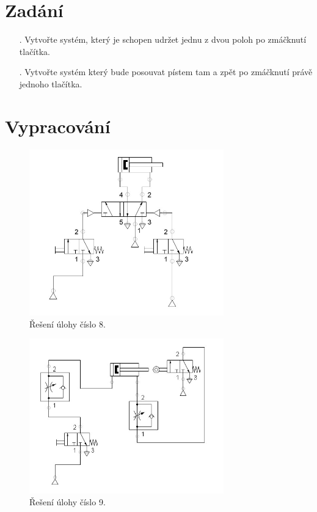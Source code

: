 \documentclass[a4paper]{article}
\begin{document}



\section*{Zadání}
\setcounter{foo}{8}
 

\begin{itemize}
	\item [\arabic{foo}.] Vytvořte systém, který je schopen udržet jednu z dvou poloh po zmáčknutí tlačítka.
	\setcounter{foo}{9}
	\item [\arabic{foo}.] Vytvořte systém který bude posouvat pístem tam a zpět po zmáčknutí právě jednoho tlačítka.
\end{itemize}

\section*{Vypracování}



\begin{figure}[H]
	\centering
	\includegraphics[width=0.75\textwidth]{lul.jpg}
	\caption{Řešení úlohy číslo 8.}
	\label{fig:mesh2}
\end{figure}

\begin{figure}[H]
	\centering
	\includegraphics[width=0.75\textwidth]{lulwxd.jpg}
	\caption{Řešení úlohy číslo 9.}
	\label{fig:mesh1}
\end{figure}
\end{document}
